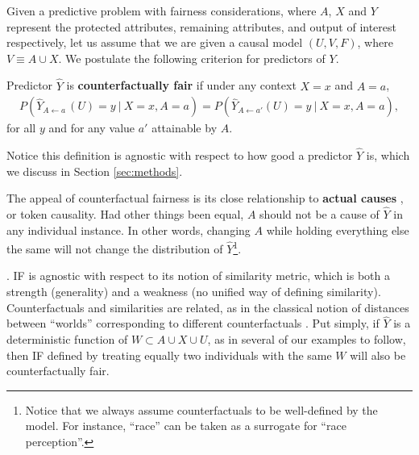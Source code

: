 Given a predictive problem with fairness considerations, where $A$, $X$ and $Y$
represent the protected attributes, remaining attributes, and output of interest respectively,
let us assume that we are given a causal model $(U, V, F)$, where $V \equiv A \cup X$.
We postulate the following criterion for predictors of $Y$.
\begin{define}
Predictor $\hat Y$ is {\bf counterfactually fair}
if under any context $X = x$ and $A = a$,
  \label{eq:cf_definition}
\begin{align}
  P(\hat Y_{A \leftarrow a\ }(U) = y\ |\ X = x, A = a)  =%
  P(\hat Y_{A \leftarrow a'}(U) = y\ |\ X = x, A = a), 
\end{align}
for all $y$ and for any value $a'$ attainable by $A$.
\end{define}

Notice this definition is agnostic with respect to how good a predictor
$\hat Y$ is, which we discuss in Section \ref{sec:methods}.

The appeal of counterfactual fairness is its close relationship to 
{\bf actual causes} \cite{halpern:16}, or token causality. Had other
things been equal, $A$ should not be a cause of $\hat Y$ in any
individual instance. In other words, changing $A$ while holding
everything else the same will not change the distribution of $\hat
Y$\footnote{Notice that we always assume counterfactuals to be
  well-defined by the model. For instance, ``race'' can be taken as a
  surrogate for ``race perception''.}. 

. IF is agnostic with
respect to its notion of similarity metric, which is both a strength
(generality) and a weakness (no unified way of defining similarity).
Counterfactuals and similarities are related, as in the classical
notion of distances between ``worlds'' corresponding to different
counterfactuals \cite{lewis:73}.  Put simply, if $\hat Y$ is a
deterministic function of $W \subset A \cup X \cup U$, as in several
of our examples to follow, then IF defined by treating equally two
individuals with the same $W$ will also be counterfactually fair.

